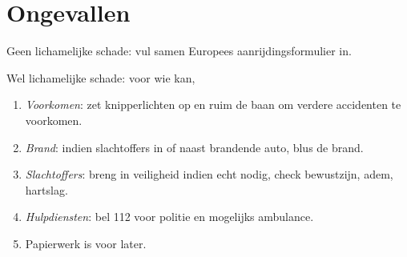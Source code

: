 \section{Ongevallen}
\begin{outline}
\1 Geen lichamelijke schade: vul samen Europees aanrijdingsformulier in.

\1 Wel lichamelijke schade: voor wie kan,
\begin{enumerate}
	\item \emph{Voorkomen}: zet knipperlichten op en ruim de baan om verdere accidenten te voorkomen.
	\item \emph{Brand}: indien slachtoffers in of naast brandende auto, blus de brand.
	\item \emph{Slachtoffers}: breng in veiligheid indien echt nodig, check bewustzijn, adem, hartslag.
	\item \emph{Hulpdiensten}: bel 112 voor politie en mogelijks ambulance.
	\item Papierwerk is voor later.
\end{enumerate}

\end{outline}


